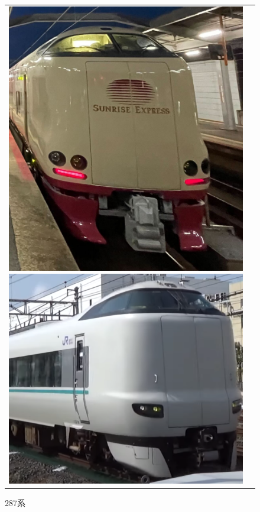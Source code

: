 \begin{figure}[htbp]
\begin{tabular}{cc}
\begin{minipage}[b]{0.15\textwidth}
			\includegraphics[width=\linewidth]{densya/285.jpg}
			\caption{285系}
			\label{fig:285}
		\end{minipage}
		\begin{minipage}[b]{0.15\textwidth}
			\includegraphics[width=\linewidth]{densya/287.png}
			\caption{287系}
			\label{fig:287}
		\end{minipage}
	
	\end{tabular}
\end{figure}

